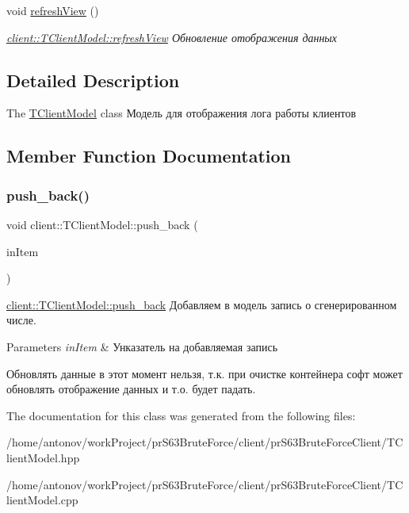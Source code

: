 \begin{DoxyCompactItemize}
\mbox{\label{classclient_1_1_t_client_model_aea0cb37f9e91c028f699e4da3663fcea}} 
void \hyperlink{classclient_1_1_t_client_model_aea0cb37f9e91c028f699e4da3663fcea}{refresh\+View} ()
\begin{DoxyCompactList}\small\item\em \hyperlink{classclient_1_1_t_client_model_aea0cb37f9e91c028f699e4da3663fcea}{client\+::\+T\+Client\+Model\+::refresh\+View} Обновление отображения данных \end{DoxyCompactList}\end{DoxyCompactItemize}


\subsection{Detailed Description}
The \hyperlink{classclient_1_1_t_client_model}{T\+Client\+Model} class Модель для отображения лога работы клиентов 

\subsection{Member Function Documentation}
\mbox{\label{classclient_1_1_t_client_model_aed00383c6177d60cb6f4b34b23fce485}} 
\subsubsection{\texorpdfstring{push\+\_\+back()}{push\_back()}}
{\footnotesize\ttfamily void client\+::\+T\+Client\+Model\+::push\+\_\+back (\begin{DoxyParamCaption}\item[{common\+Define\+Client\+::td\+Log\+Item\+Client}]{in\+Item }\end{DoxyParamCaption})}



\hyperlink{classclient_1_1_t_client_model_aed00383c6177d60cb6f4b34b23fce485}{client\+::\+T\+Client\+Model\+::push\+\_\+back} Добавляем в модель запись о сгенерированном числе. 


\begin{DoxyParams}{Parameters}
{\em in\+Item} & Унказатель на добавляемая запись\\
\hline
\end{DoxyParams}
Обновлять данные в этот момент нельзя, т.\+к. при очистке контейнера софт может обновлять отображение данных и т.\+о. будет падать. 

The documentation for this class was generated from the following files\+:\begin{DoxyCompactItemize}
\item 
/home/antonov/work\+Project/pr\+S63\+Brute\+Force/client/pr\+S63\+Brute\+Force\+Client/T\+Client\+Model.\+hpp\item 
/home/antonov/work\+Project/pr\+S63\+Brute\+Force/client/pr\+S63\+Brute\+Force\+Client/T\+Client\+Model.\+cpp\end{DoxyCompactItemize}
